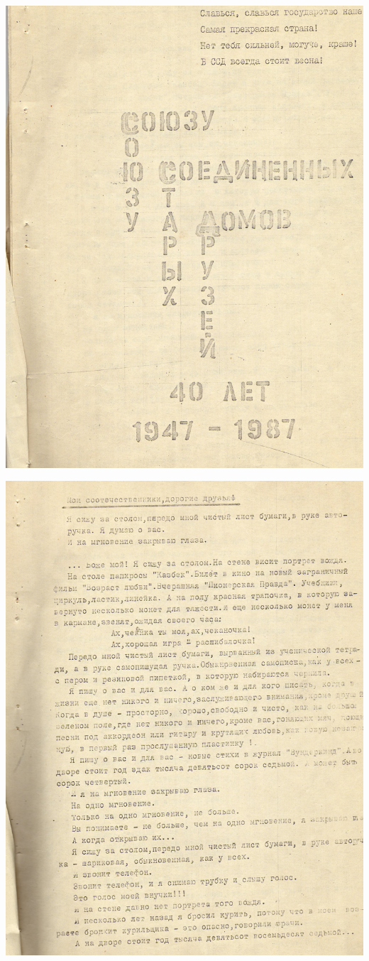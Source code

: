 \noindent
\includegraphics[width=\textwidth]{inc/Vynd/Vynd016a}

\noindent
\includegraphics[width=\textwidth]{inc/Vynd/Vynd017a}

